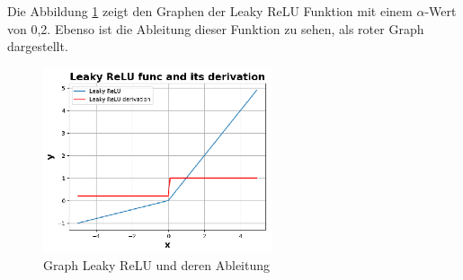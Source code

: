 

Die Abbildung \ref{img:leaky_relu_func_graph} zeigt den Graphen der Leaky ReLU Funktion mit einem $\alpha$-Wert von 0,2. Ebenso ist die Ableitung dieser Funktion zu sehen, als roter Graph dargestellt.

\begin{figure}[!ht]
	\includegraphics[width=0.6\textwidth]{content/chapter_basics/plots/leaky_relu_func_plot.eps}
	\centering
	\caption{Graph Leaky ReLU und deren Ableitung}
	\label{img:leaky_relu_func_graph}
\end{figure}


